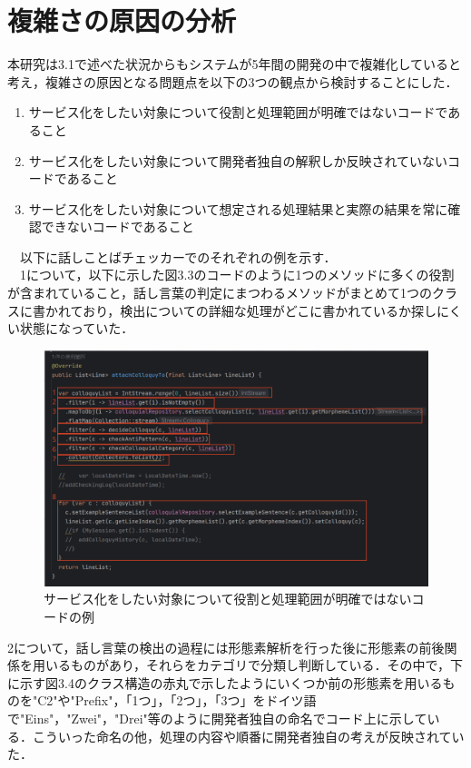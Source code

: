 \documentclass[12pt, a4paper]{jreport}
\begin{document}
\section{複雑さの原因の分析}
本研究は3.1で述べた状況からもシステムが5年間の開発の中で複雑化していると考え，複雑さの原因となる問題点を以下の3つの観点から検討することにした．
\begin{enumerate}
\item サービス化をしたい対象について役割と処理範囲が明確ではないコードであること
\item サービス化をしたい対象について開発者独自の解釈しか反映されていないコードであること
\item サービス化をしたい対象について想定される処理結果と実際の結果を常に確認できないコードであること
\end{enumerate}
　以下に話しことばチェッカーでのそれぞれの例を示す．
\\　1について，以下に示した図3.3のコードのように1つのメソッドに多くの役割が含まれていること，話し言葉の判定にまつわるメソッドがまとめて1つのクラスに書かれており，検出についての詳細な処理がどこに書かれているか探しにくい状態になっていた．
\begin{figure}[H]
\centering \includegraphics[width=1\linewidth]{image/genin1.1.png}
\caption{サービス化をしたい対象について役割と処理範囲が明確ではないコードの例}
\label{fig:enter-label}
\end{figure}
2について，話し言葉の検出の過程には形態素解析を行った後に形態素の前後関係を用いるものがあり，それらをカテゴリで分類し判断している．その中で，下に示す図3.4のクラス構造の赤丸で示したようにいくつか前の形態素を用いるものを"C2"や"Prefix"，「1つ」，「2つ」，「3つ」をドイツ語で"Eins"，"Zwei"，"Drei"等のように開発者独自の命名でコード上に示している．こういった命名の他，処理の内容や順番に開発者独自の考えが反映されていた．
\end{document}
